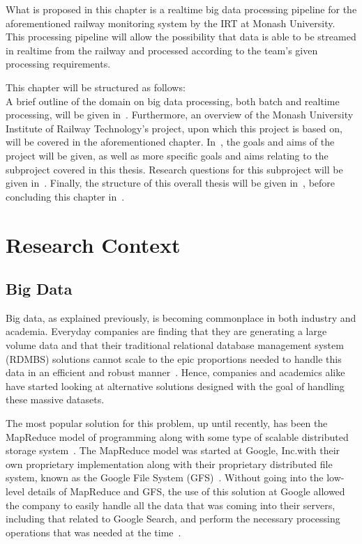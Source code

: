 What is proposed in this chapter is a realtime big data processing pipeline for the aforementioned railway monitoring
system by the IRT at Monash University. This processing pipeline will allow the possibility that data is able to be
streamed in realtime from the railway and processed according to the team's given processing requirements.

This chapter will be structured as follows:\\
A brief outline of the domain on big data processing, both batch and realtime processing, will be given
in~. Furthermore, an overview of the Monash University Institute of Railway Technology's
project, upon which this project is based on, will be covered in the aforementioned chapter. In~,
the goals and aims of the project will be given, as well as more specific goals and aims relating to the subproject
covered in this thesis. Research questions for this subproject will be given in~.
Finally, the structure of this overall thesis will be given in~, before
concluding this chapter in~.




\section{Research Context} %
\label{sec:research_context}

\subsection{Big Data} %
\label{sub:big_data}

Big data, as explained previously, is becoming commonplace in both industry and academia. Everyday companies are finding
that they are generating a large volume data and that their traditional relational database management system (RDMBS) solutions cannot
scale to the epic proportions needed to handle this data in an efficient and robust manner~\cite{marz2013principles}.
Hence, companies and academics alike have started looking at alternative solutions designed with the goal of handling
these massive datasets.

The most popular solution for this problem, up until recently, has been the MapReduce %
 model of programming along with
some type of scalable distributed storage system~\cite{bifet_mining_2013}. The MapReduce model was started at Google,
Inc.\@ with their own proprietary implementation along with their proprietary distributed file system, known as the Google
File System (GFS)~\cite{ghemawat_google_2003}. Without going into the low-level details of MapReduce and GFS, the use of this solution at Google
allowed the company to easily handle all the data that was coming into their servers, including that related to Google Search, and perform the necessary
processing operations that was needed at the time~\cite{ghemawat_google_2003,dean_mapreduce:_2008}.


